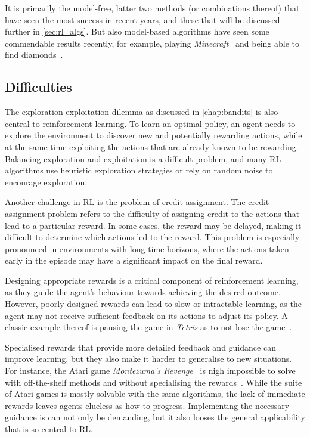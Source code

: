 It is primarily the model-free, latter two methods (or combinations thereof) that have seen the most success in recent years, and these that will be discussed further in \cref{sec:rl_algs}.
But also model-based algorithms have seen some commendable results recently, for example, playing \textit{Minecraft}~\autocite{minecraft} and being able to find diamonds~\autocite{hafner2023}.


\subsection{Difficulties}
\label{sec:difficulties}
The exploration-exploitation dilemma as discussed in \cref{chap:bandits} is also central to reinforcement learning.
To learn an optimal policy, an agent needs to explore the environment to discover new and potentially rewarding actions, while at the same time exploiting the actions that are already known to be rewarding.
Balancing exploration and exploitation is a difficult problem, and many RL algorithms use heuristic exploration strategies or rely on random noise to encourage exploration.

Another challenge in RL is the problem of credit assignment.
The credit assignment problem refers to the difficulty of assigning credit to the actions that lead to a particular reward.
In some cases, the reward may be delayed, making it difficult to determine which actions led to the reward.
This problem is especially pronounced in environments with long time horizons, where the actions taken early in the episode may have a significant impact on the final reward.

Designing appropriate rewards is a critical component of reinforcement learning, as they guide the agent's behaviour towards achieving the desired outcome.
However, poorly designed rewards can lead to slow or intractable learning, as the agent may not receive sufficient feedback on its actions to adjust its policy.
A classic example thereof is pausing the game in \textit{Tetris} as to not lose the game~\autocite{murphy2013}.

Specialised rewards that provide more detailed feedback and guidance can improve learning, but they also make it harder to generalise to new situations.
For instance, the Atari game \textit{Montezuma's Revenge}~\autocite{montezuma} is nigh impossible to solve with off-the-shelf methods and without specialising the rewards~\autocite{salimans2018}.
While the suite of Atari games is mostly solvable with the same algorithms, the lack of immediate rewards leaves agents clueless as how to progress.
Implementing the necessary guidance is can not only be demanding, but it also looses the general applicability that is so central to RL.

